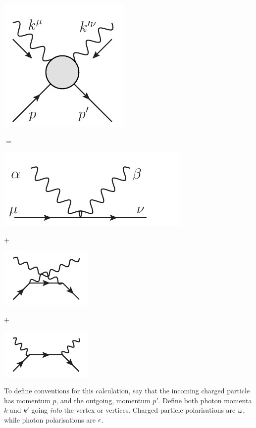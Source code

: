 \begin{minipage}{1in}
   \includegraphics[scale=0.7]{eps/blob1} 
\end{minipage}
$=$
\begin{minipage}{1.6in}
   \includegraphics[scale=0.7]{eps/two-photon-fundamental} 
\end{minipage}
$+$
\begin{minipage}{1.6in}
   \includegraphics[scale=1]{eps/crossed-small} 
\end{minipage}
$+$
\begin{minipage}{1.6in}
   \includegraphics[scale=1]{eps/uncrossed-small} 
\end{minipage}


To define conventions for this calculation, say that the incoming charged particle has momentum $p$, and the outgoing, momentum $p'$.  Define both photon momenta $k$ and $k'$ going \emph{into} the vertex or vertices.  Charged particle polarisations are $\omega$, while photon polarisations are $\epsilon$.

